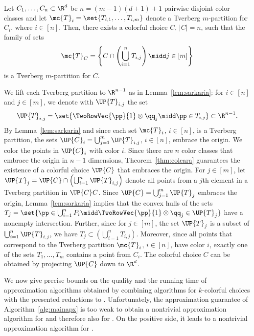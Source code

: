 \begin{theorem}\label{thm:colkirchberger}
Let $C_1,\dots, C_n \subset \R^d$ be $n=(m-1)(d+1)+1$ pairwise disjoint 
color classes and let $\mc{T}_i = \set{T_{i,1},\dots,T_{i,m}}$ 
denote a Tverberg
  $m$-partition for $C_i$, where $i \in [n]$. Then, there exists a colorful
  choice $C$, $|C|=n$, such that the family of sets
\[
  \mc{T}_{C} = \left\{ C \cap \left( \bigcup_{i=1}^n T_{i,j} \right) 
  \midd j \in [m] \right\}
\]
  is a Tverberg $m$-partition for $C$.
\end{theorem}
\begin{prf}
  We lift each Tverberg partition to $\R^{n-1}$ as in 
  Lemma~\ref{lem:sarkaria}: for $i \in [n]$ and $j \in [m]$, we 
  denote with $\UP{T}_{i,j}$ the set
\[
  \UP{T}_{i,j} = \set{ \TwoRowVec{\pp}{1} \otimes \qq_j \midd 
  \pp \in T_{i,j}} \subset
  \R^{n-1}.
\]
By Lemma~\ref{lem:sarkaria} and since each set 
$\mc{T}_i$, $i \in [n]$, is a Tverberg
partition, the sets $\UP{C}_i = \bigcup_{j=1}^m \UP{T}_{i,j}$, $i \in [n]$,
embrace the origin. We color the points in $\UP{C}_i$ with color $i$. Since
there are $n$ color classes that embrace the origin in $n-1$ dimensions,
Theorem~\ref{thm:colcara} guarantees the existence of a colorful 
choice $\UP{C}$ that
embraces the origin. For $j \in[m]$, let $\UP{T}_{j}=\UP{C} \cap \left(
\bigcup_{i=1}^n \UP{T}_{i,j} \right)$ denote all points from a $j$th 
element in a Tverberg partition in $\UP{C}C$. Since 
$\UP{C}= \bigcup_{j=1}^m \UP{T}_{j}$ embraces
the origin, Lemma~\ref{lem:sarkaria} implies that the convex hulls of
the sets 
$T_j = \set{ \pp \in \bigcup_{i=1}^n P_i \midd \TwoRowVec{\pp}{1} 
\otimes \qq_j \in \UP{T}_j}$ have a nonempty intersection. 
Further, since for $j \in [m]$, the set
$\UP{T}_{j}$ is a subset of $\bigcup_{i=1}^n \UP{T}_{i,j}$, we have $T_j
\subset \left( \bigcup_{i=1}^n T_{i,j} \right)$. Moreover, since all points
that correspond to the Tverberg partition $\mc{T}_i$, $i \in [n]$, have
color $i$, exactly one of the sets $T_1,\dots,T_m$ contains a point 
from $C_i$. The colorful choice $C$ can be obtained by projecting 
$\UP{C}$ down to $\R^d$.
\end{prf}

We now give precise bounds on the quality and the running time of 
approximation algorithms obtained by
combining algorithms for $k$-colorful choices with the presented
reductions to \CCP. Unfortunately, the approximation
guarantee of Algorithm~\ref{alg:mainapx} is too weak to obtain a nontrivial
approximation algorithm for \Tverberg and therefore also for \Centerpoint. 
On the positive side, it leads to a nontrivial approximation algorithm for
\ColKirchberger.

